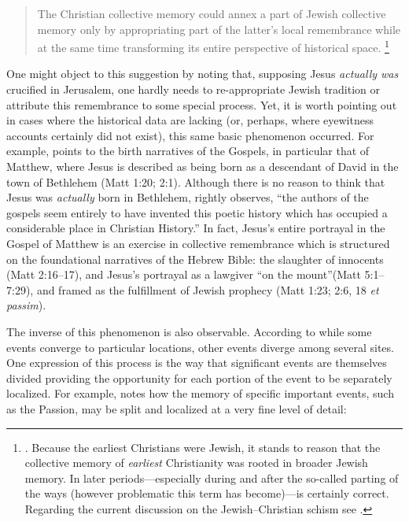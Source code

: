 \begin{quote}
    The Christian collective memory could annex a part of Jewish collective memory only by appropriating part of the latter's local remembrance while at the same time transforming its entire perspective of historical space.%
        \footnote{%
        \Cite[215]{halbwachs1992}.
        Because the earliest Christians were Jewish, it stands to reason that the collective memory of \emph{earliest} Christianity was rooted in broader Jewish memory. In later periods---especially during and after the so-called parting of the ways (however problematic this term has become)---\halbwachs is certainly correct. Regarding the current discussion on the Jewish--Christian schism see 
        \cite[19--60]{burns2016}.}
\end{quote}  
\noindent
One might object to this suggestion by noting that, supposing Jesus \emph{actually was} crucified in Jerusalem, one hardly needs to re-appropriate Jewish tradition or attribute this remembrance to some special process. Yet, it is worth pointing out in cases where the historical data are lacking (or, perhaps, where eyewitness accounts certainly did not exist), this same basic phenomenon occurred. For example, \halbwachs points to the birth narratives of the Gospels, in particular that of Matthew, where Jesus is described as being born as a descendant of David in the town of Bethlehem (Matt 1:20; 2:1). Although there is no reason to think that Jesus was \emph{actually} born in Bethlehem, \halbwachs rightly observes, ``the authors of the gospels seem entirely to have invented this poetic history which has occupied a considerable place in Christian History.''%
    \autocite[214]{halbwachs1992}
In fact, Jesus's entire portrayal in the Gospel of Matthew is an exercise in collective remembrance which is structured on the foundational narratives of the Hebrew Bible: the slaughter of innocents (Matt 2:16--17), and Jesus's portrayal as a lawgiver ``on the mount''(Matt 5:1--7:29), and framed as the fulfillment of Jewish prophecy (Matt 1:23; 2:6, 18 \emph{et passim}). 

The inverse of this phenomenon is also observable. According to \halbwachs while some events converge to particular locations, other events diverge among several sites. One expression of this process is the way that significant events are themselves divided providing the opportunity for each portion of the event to be separately localized. For example, \halbwachs notes how the memory of specific important events, such as the Passion, may be split and localized at a very fine level of detail:  

